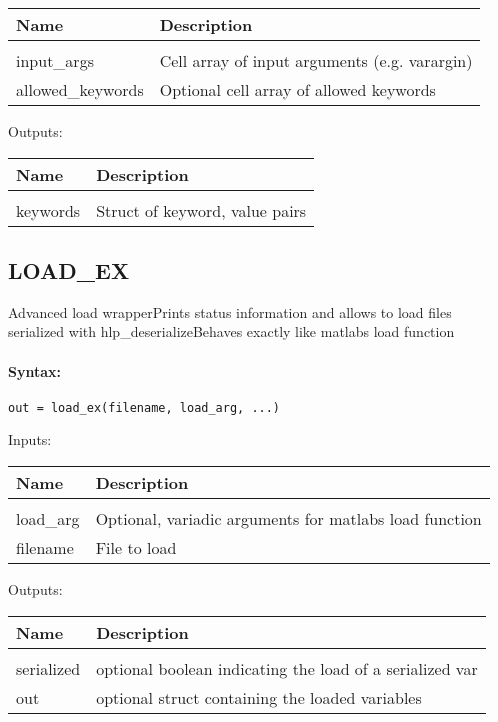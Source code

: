 \begin{tabular}{|l|p{5cm}|}
\hline
\textbf{Name} & \textbf{Description} \\
\hline \hline \\
input\_args & Cell array of input arguments (e.g. varargin)  \\ \hline
allowed\_keywords & Optional cell array of allowed keywords  \\ \hline
\end{tabular}
Outputs:

\begin{tabular}{|l|p{5cm}|}
\hline
\textbf{Name} & \textbf{Description} \\
\hline \hline \\
keywords & Struct of keyword, value pairs  \\ \hline
\end{tabular}

\subsection{LOAD\_EX}

Advanced load wrapperPrints status information and allows to load files serialized with hlp\_deserializeBehaves exactly like matlabs load function

\paragraph{Syntax:} \verb|out = load_ex(filename, load_arg, ...)|

Inputs:

\begin{tabular}{|l|p{5cm}|}
\hline
\textbf{Name} & \textbf{Description} \\
\hline \hline \\
load\_arg & Optional, variadic arguments for matlabs load function  \\ \hline
filename & File to load  \\ \hline
\end{tabular}
Outputs:

\begin{tabular}{|l|p{5cm}|}
\hline
\textbf{Name} & \textbf{Description} \\
\hline \hline \\
serialized & optional boolean indicating the load of a serialized var  \\ \hline
out & optional struct containing the loaded variables  \\ \hline
\end{tabular}

